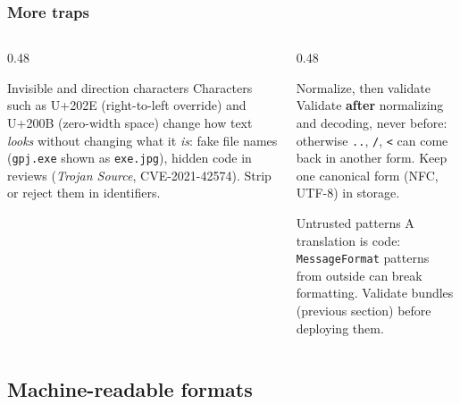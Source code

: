 \documentclass[aspectratio=169,10pt,compress]{beamer}
\begin{document}
\begin{frame}[t,fragile] \frametitle{More traps}
  \begin{columns}[T]
    \begin{column}{0.48\textwidth}
      \begin{block}{Invisible and direction characters}
        \small Characters such as U+202E (right-to-left override) and U+200B (zero-width space) change how text
        \emph{looks} without changing what it \emph{is}: fake file names (\texttt{gpj.exe} shown as \texttt{exe.jpg}),
        hidden code in reviews (\emph{Trojan Source}, CVE-2021-42574). Strip or reject them in identifiers.
      \end{block}
    \end{column}
    \begin{column}{0.48\textwidth}
      \begin{block}{Normalize, then validate}
        \small Validate \textbf{after} normalizing and decoding, never before: otherwise \texttt{..}, \texttt{/},
        \texttt{<} can come back in another form. Keep one canonical form (NFC, UTF-8) in storage.
      \end{block}
      \begin{block}{Untrusted patterns}
        \small A translation is code: \texttt{MessageFormat} patterns from outside can break formatting.
        Validate bundles (previous section) before deploying them.
      \end{block}
    \end{column}
  \end{columns}
\end{frame}

\subsection[Machine formats]{Machine-readable formats}
\end{document}
